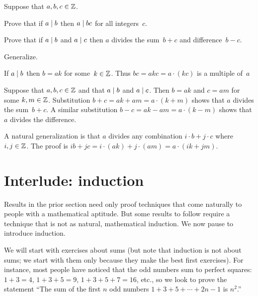\documentclass{ibl}
\begin{document}
\begin{ex}
Suppose that $a,b,c\in\mathbb{Z}$.
\begin{exes}
\item Prove that if $a\mid b$ then $a\mid bc$ for all integers~$c$.
\item Prove that if $a\mid b$ and $a\mid c$ then $a$ divides the 
  sum~$b+c$ and difference~$b-c$.
\item Generalize.
\end{exes}
\begin{ans}
\begin{exes}
\item If $a\mid b$ then $b=ak$ for some~$k\in\mathbb{Z}$.
  Thus $bc=akc=a\cdot(kc)$ is a multiple of~$a$
\item Suppose that $a,b,c\in\mathbb{Z}$ and that $a\mid b$ and $a\mid c$.
  Then $b=ak$ and $c=am$ for some $k,m\in\mathbb{Z}$. 
  Substitution  
  $b+c=ak+am=a\cdot(k+m)$
  shows that $a$ divides the sum~$b+c$.
  A similar substitution
  $b-c=ak-am=a\cdot(k-m)$
  shows that $a$ divides the difference.
\item A natural generalization is that $a$ divides any combination
  $i\cdot b+j\cdot c$ where $i,j\in\mathbb{Z}$.
  The proof is
  $ib+jc=i\cdot (ak)+j\cdot(am)=a\cdot(ik+jm)$.
\end{exes}
\end{ans}
\end{ex}




\section{Interlude: induction}
Results in the prior section need only proof techniques that come naturally
to people with a mathematical aptitude.
But some results to follow require a technique 
that is not as natural, mathematical induction.
We now pause to introduce induction.

We will start with exercises about sums 
(but note that induction is not about sums;
we start with them only because they make the best first exercises).
For instance, most people have noticed that the odd numbers sum to 
perfect squares: $1+3=4$, $1+3+5=9$, $1+3+5+7=16$, etc.,
so we look to prove 
the statement 
``The sum of the first $n$ odd numbers $1+3+5+\cdots+2n-1$ is $n^2$.'' 
\end{document}
